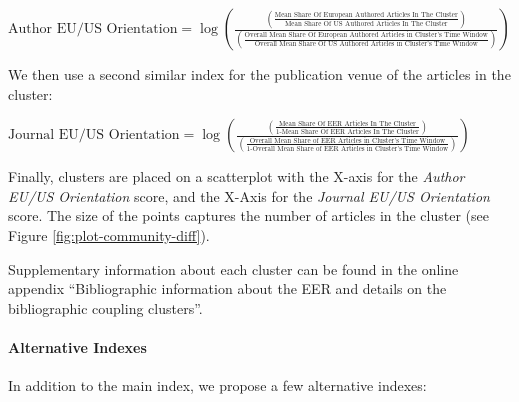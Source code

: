 \documentclass[
  12pt,
  onecolumn]{article}
\begin{document}
\({\scriptstyle \text{Author EU/US Orientation}=\log(\frac{(\frac{\text{Mean Share Of European Authored Articles In The Cluster}}{\text{Mean Share Of US Authored Articles In The Cluster}})} {(\frac{\text{Overall Mean Share Of European Authored Articles in Cluster's Time Window}}{\text{Overall Mean Share Of US Authored Articles in Cluster's Time Window}})})}\)
\bigskip

We then use a second similar index for the publication venue of the
articles in the cluster:

\bigskip

\({\scriptstyle \text{Journal EU/US Orientation}=\log(\frac{(\frac{\text{Mean Share Of EER Articles In The Cluster}}{\text{1-Mean Share Of EER Articles In The Cluster}})} {(\frac{\text{Overall Mean Share of EER Articles in Cluster's Time Window}}{\text{1-Overall Mean Share of EER Articles in Cluster's Time Window}})})}\)
\bigskip

Finally, clusters are placed on a scatterplot with the X-axis for the
\emph{Author EU/US Orientation} score, and the X-Axis for the
\emph{Journal EU/US Orientation} score. The size of the points captures
the number of articles in the cluster (see Figure
\ref{fig:plot-community-diff}).

Supplementary information about each cluster can be found in the online
appendix ``Bibliographic information about the EER and details on the
bibliographic coupling clusters''.

\hypertarget{alt-index}{%
\paragraph*{Alternative Indexes}\label{alt-index}}

In addition to the main index, we propose a few alternative indexes:
\end{document}
